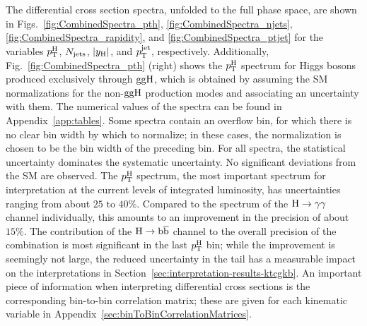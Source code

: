 The differential cross section spectra, unfolded to the full phase space, are shown in Figs.~\ref{fig:CombinedSpectra_pth}, \ref{fig:CombinedSpectra_njets}, \ref{fig:CombinedSpectra_rapidity}, and \ref{fig:CombinedSpectra_ptjet} for the variables $p_\mathrm{T}^\mathrm{H}$, $N_\text{jets} $, $\left|y_\mathrm{H}\right| $, and $p_\mathrm{T}^\text{jet} $, respectively.
% 
Additionally, Fig.~\ref{fig:CombinedSpectra_pth} (right) shows the $p_\mathrm{T}^\mathrm{H}$ spectrum for Higgs bosons produced exclusively through $\mathrm{g}\mathrm{g}\mathrm{H}$, which is obtained by assuming the SM normalizations for the non-$\mathrm{g}\mathrm{g}\mathrm{H}$ production modes and associating an uncertainty with them.
% 
The numerical values of the spectra can be found in Appendix~\ref{app:tables}.
% 
Some spectra contain an overflow bin, for which there is no clear bin width by which to normalize; in these cases, the normalization is chosen to be the bin width of the preceding bin.
% 
For all spectra, the statistical uncertainty dominates the systematic uncertainty.
% 
No significant deviations from the SM are observed.
% 
The $p_\mathrm{T}^\mathrm{H}$ spectrum, the most important spectrum for interpretation at the current levels of integrated luminosity, has uncertainties ranging from about $25$ to $40\%$.
% 
Compared to the spectrum of the $\mathrm{H}\to\mathrm{\gamma}\mathrm{\gamma}$ channel individually, this amounts to an improvement in the precision of about $15\%$.
% 
The contribution of the $\mathrm{H}\to\mathrm{b}\overline{\mathrm{b}}$ channel to the overall precision of the combination is most significant in the last $p_\mathrm{T}^\mathrm{H}$ bin; while the improvement is seemingly not large, the reduced uncertainty in the tail has a measurable impact on the interpretations in Section~\ref{sec:interpretation-results-ktcgkb}.
% 
An important piece of information when interpreting differential cross sections is the corresponding bin-to-bin correlation matrix; these are given for each kinematic variable in Appendix~\ref{sec:binToBinCorrelationMatrices}.


